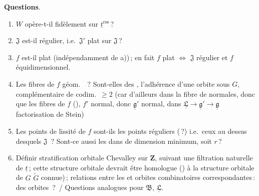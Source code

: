 \documentclass[11pt,a4paper]{article}
\begin{document}
\textbf{Questions}.
\begin{enumerate}
\item[0)] $W$ opère-t-il fidèlement sur $\underline{t}^{\mathrm{rss}}$\,?
\item[a)] $\mathfrak{J}$ est-il régulier, i.e.\ $\mathfrak{J}'$ plat sur
$\mathfrak{J}$\,?
\item[b)] $f$ est-il plat (indépendamment de a))\,; en fait
$f$ plat $\Longleftrightarrow$ $\mathfrak{J}$ régulier et $f$
équidimensionnel.
\item[c)] Les fibres de $f$ géom.\ \struck{\ill{}} \,?
Sont-elles des \ill{},  \ill{} l'adhérence d'une orbite sous
$G$,  complémentaire \ill{} de codim.\ $\geqslant 2$ (car
d'ailleurs dans la fibre \ill{} de \ill{} normales, donc
 que les fibres de $f$ 
(), \ill{} $f'$ normal, donc
$\underline{\mathfrak{g}}'$ normal, dans
$\underline{\mathfrak{L}}\to\underline{\mathfrak{g}}'\to\underline{\mathfrak{g}}$
factorisation de Stein)
\item[d)] Les points de lissité de $f$ sont-ils les points réguliers
(\,?) i.e.\ ceux au dessus desquels $\mathfrak{J}$
\ill{}\,? \struck{\ill{} \ill{}} Sont-ce aussi les \ill{} \ill{} dans
\ill{} de dimension \ill{} \ill{} \ill{} minimum, soit $r$\,?
\item[e)]  Définir stratification orbitale \ill{} \ill{} Chevalley sur
$\mathbf{Z}$, suivant une filtration naturelle de $\underline{t}$\,; cette
structure orbitale devrait être homologue () à la structure orbitale de $G$ 
$\tilde G$ \ill{} connue)\,; relations entre les  \ill{}
et orbites combinatoires correspondantes\,: des orbites \,?
\,/ Questions analogues pour $\mathfrak{B}$, $\underline{\mathfrak{L}}$.
\end{enumerate}
\end{document}
